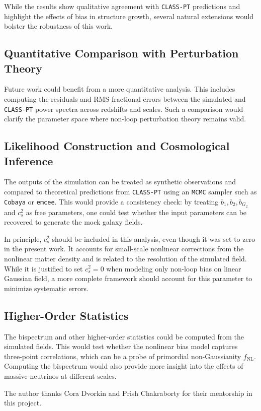 \documentclass[trackchanges]{aastex7}
\begin{document}
While the results show qualitative agreement with \texttt{CLASS-PT} predictions and highlight the effects of bias in structure growth, several natural extensions would bolster the robustness of this work.

\subsection{Quantitative Comparison with Perturbation Theory}

Future work could benefit from a more quantitative analysis. 
This includes computing the residuals and RMS fractional errors between the simulated and \texttt{CLASS-PT} power spectra across redshifts and scales. 
Such a comparison would clarify the parameter space where non-loop perturbation theory remains valid.

\subsection{Likelihood Construction and Cosmological Inference}

The outputs of the simulation can be treated as synthetic observations and compared to theoretical predictions from \texttt{CLASS-PT} using an \texttt{MCMC} sampler such as \texttt{Cobaya} or \texttt{emcee}. 
This would provide a consistency check: by treating \( b_1, b_2, b_{G_2} \) and \( c_s^2 \) as free parameters, one could test whether the input parameters can be recovered to generate the mock galaxy fields.

In principle, \( c_s^2 \) should be included in this analysis, even though it was set to zero in the present work. 
It accounts for small-scale nonlinear corrections from the nonlinear matter density and is related to the resolution of the simulated field. 
While it is justified to set \( c_s^2 = 0 \) when modeling only non-loop bias on linear Gaussian field, a more complete framework should account for this parameter to minimize systematic errors.

\subsection{Higher-Order Statistics}

The bispectrum and other higher-order statistics could be computed from the simulated fields. 
This would test whether the nonlinear bias model captures three-point correlations, which can be a probe of primordial non-Gaussianity $f_{\text{NL}}$.
Computing the bispectrum would also provide more insight into the effects of massive neutrinos at different scales.

\begin{acknowledgments}
    The author thanks Cora Dvorkin and Prish Chakraborty for their mentorship in this project.
\end{acknowledgments} 

{}

\end{document}
